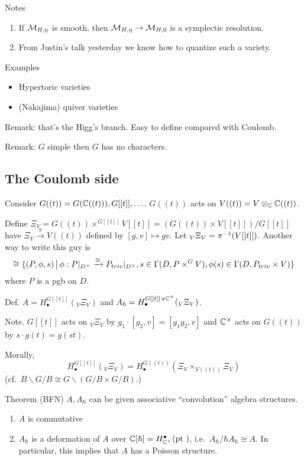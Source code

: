 Notes 
\begin{enumerate}
    \item If $\mathcal{M}_{H,\eta}$ is smooth, then $\mathcal{M}_{H,\eta} \rightarrow \mathcal{M}_{H,0}$ is a symplectic resolution. 
    \item From Justin's talk yesterday we know how to quantize such a variety. 
\end{enumerate}

Examples 
\begin{itemize}
    \item Hypertoric varieties 
    \item (Nakajima) quiver varieties
\end{itemize}

Remark: that's the Higg's branch. Easy to define compared with Coulomb. 

Remark: $G$ simple then $G$ has no characters. 

\subsection{The Coulomb side}

Consider $G((t)) = G(\mathbb{C}((t))), G[[t]],\ldots$. $G((t))$ acts on $V((t)) = V\otimes_{\mathbb{C}} \mathbb{C}((t))$. 

Define $\Xi_V = G((t)) \times^{G[[t]]} V[[t]] = (G((t))\times V[[t]])/G[[t]]$ have $\Xi_V\xrightarrow{\pi} V((t))$ defined by $[g,v]\mapsto gv$. Let ${}_V\Xi_V = {\pi}^{-1}(V[[t]])$. 
Another way to write this guy is 
\[
\cong \{
(P,\phi,s) \,\big|\, \phi: P|_{D^\times}\xrightarrow{\cong} P_{triv}|_{D^\times}, s\in \Gamma(D,P\times^G V), \phi(s) \in \Gamma(D,P_{triv}\times V)    
\}    
\] 
where $P$ is a pgb on $D$. 

Def. $A = H_\bullet^{G[[t]]} ({}_V\Xi_V)$ and $A_{\hbar} = H_\bullet^{G[[t]]\rtimes\mathbb{C}^\times}({}_V\Xi_V)$. 

Note. $G[[t]]$ acts on ${}_V\Xi_V$ by $g_1\cdot [g_2,v] = [g_1g_2,v]$ and $\mathbb{C}^\times$ acts on $G((t))$ by $s\cdot g(t) = g(st)$. 

Morally, $$H_\bullet^{G[[t]]} ({}_V\Xi_V) = H_\bullet^{G((t))} (\Xi_V\times_{V((t))} \Xi_V) $$ 
(cf.\ $B\backslash G/B \cong G\backslash(G/B\times G/B)$.)

Theorem (BFN) $A, A_{\hbar}$ can be given associative ``convolution'' algebra structures. 
\begin{enumerate}
    \item $A$ is commutative 
    \item $A_{\hbar}$ is a deformation of $A$ over $\mathbb{C}[\hbar] = H^\bullet_{\mathbb{C}^\times} ({\rm pt ~}) $, i.e.\ $A_{\hbar}/\hbar A_{\hbar} \cong A$. In particular, this implies that $A$ has a Poisson structure. 
\end{enumerate}

